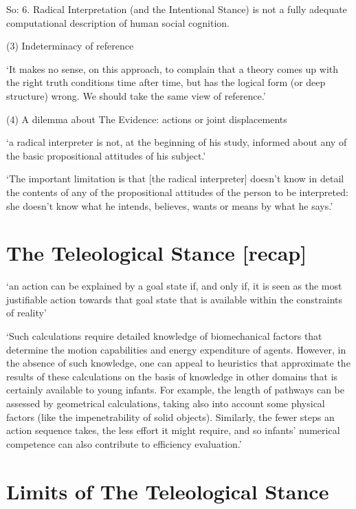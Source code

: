 \documentclass[12pt]{extarticle}
\begin{document}
\begin{multicols*}{3}
So: 6. Radical Interpretation (and the Intentional Stance) is not a fully adequate computational description of human social cognition.


(3) Indeterminacy of reference

‘It makes no sense, on this approach, to complain that a theory comes up with
the right truth conditions time after time, but has the logical form
(or deep structure) wrong. We should take the same view of reference.’
\citep[p.~223]{Davidson:1977kn}

(4) A dilemma about The Evidence: actions or joint displacements

‘a radical interpreter is not, at the beginning of his study, informed about
any of the basic propositional attitudes of his subject.’
\citep[p.~17]{Davidson:1984pr}

‘The important limitation is that [the radical interpreter] doesn’t know in
detail the contents of any of the propositional attitudes of the person to
be interpreted: she doesn’t know what he intends, believes, wants or means
by what he says.’ \citep[p.~]{Davidson:1994ff}



\section{The Teleological Stance [recap]}

‘an action can be explained by a goal state if, and only if, it is seen as  the  most justifiable action towards that goal state that is available within the constraints of reality’
\citep[p.~255]{Csibra:1998cx}

‘Such calculations require detailed knowledge of biomechanical factors that
determine the motion capabilities and energy expenditure of agents. However,
in the absence of such knowledge, one can appeal to heuristics that approximate
the results of these calculations on the basis of knowledge in other domains
that is certainly available to young infants. For example, the length of
pathways can be assessed by geometrical calculations, taking also into
account some physical factors (like the impenetrability of solid objects).
Similarly, the fewer steps an action sequence takes, the less effort it might
require, and so infants’ numerical competence can also contribute to efficiency
evaluation.’ \citep{csibra:2013_teleological}



\section{Limits of The Teleological Stance}


\end{multicols*}
\end{document}
